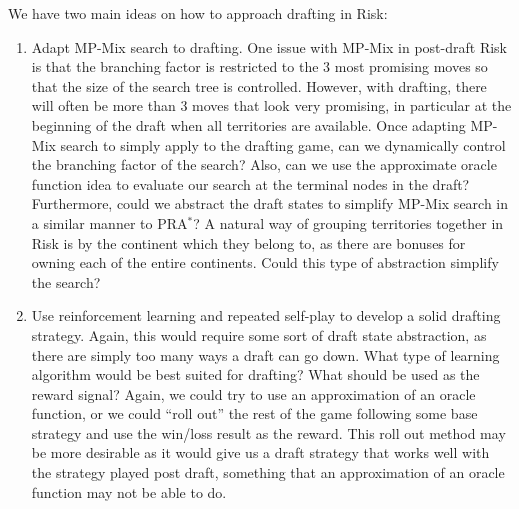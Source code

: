 \documentclass[letterpaper]{article}
\numberwithin{equation}{section}
\numberwithin{theorem}{section}
\numberwithin{lemma}{section}
\numberwithin{df}{section}
\begin{document}
We have two main ideas on how to approach drafting in Risk:
\begin{enumerate}
  \item Adapt MP-Mix search \cite{ZuckFelnerKraus2009} to drafting.  One issue with MP-Mix in post-draft Risk is that the branching factor is restricted to the 3 most promising moves so that the size of the search tree is controlled.  However, with drafting, there will often be more than 3 moves that look very promising, in particular at the beginning of the draft when all territories are available.  Once adapting MP-Mix search to simply apply to the drafting game, can we dynamically control the branching factor of the search?  Also, can we use the approximate oracle function idea to evaluate our search at the terminal nodes in the draft?  Furthermore, could we abstract the draft states to simplify MP-Mix search in a similar manner to PRA$^*$?  A natural way of grouping territories together in Risk is by the continent which they belong to, as there are bonuses for owning each of the entire continents.  Could this type of abstraction simplify the search?

\item Use reinforcement learning and repeated self-play to develop a solid drafting strategy.  Again, this would require some sort of draft state abstraction, as there are simply too many ways a draft can go down.  What type of learning algorithm would be best suited for drafting?  What should be used as the reward signal?  Again, we could try to use an approximation of an oracle function, or we could ``roll out'' the rest of the game following some base strategy and use the win/loss result as the reward.  This roll out method may be more desirable as it would give us a draft strategy that works well with the strategy played post draft, something that an approximation of an oracle function may not be able to do.
\end{enumerate}




\end{document}
